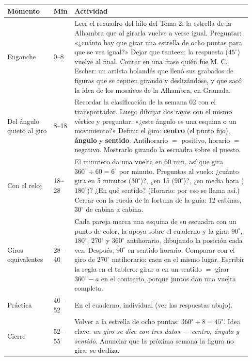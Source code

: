 \documentclass[11pt]{article}
\begin{document}
\begin{center}
{\renewcommand{\arraystretch}{1.3}
\begin{tabularx}{\linewidth}{@{}l l X@{}}
  \toprule
  \textbf{Momento} & \textbf{Min} & \textbf{Actividad}\\
  \midrule
  Enganche & 0--8 & Leer el recuadro del hilo del Tema 2: la estrella de la Alhambra que
    al girarla vuelve a verse igual. Preguntar: «¿cuánto hay que girar una estrella de
    ocho puntas para que se vea igual?» Dejar que tanteen; la respuesta ($45^\circ$)
    vuelve al final. Contar en una frase quién fue M. C. Escher: un artista holandés que
    llenó sus grabados de figuras que se repiten girando y deslizándose, y que sacó la
    idea de los mosaicos de la Alhambra, en Granada.\\
  Del ángulo quieto al giro & 8--18 & Recordar la clasificación de la semana 02 con el
    transportador. Luego dibujar dos rayos con el mismo vértice y preguntar: «¿este
    ángulo es una esquina o un movimiento?» Definir el giro: \textbf{centro} (el punto
    fijo), \textbf{ángulo} y \textbf{sentido}. Antihorario $=$ positivo, horario $=$
    negativo. Mostrarlo girando la escuadra sobre el puesto.\\
  Con el reloj & 18--28 & El minutero da una vuelta en 60 min, así que gira
    $360^\circ \div 60 = 6^\circ$ por minuto. Preguntas al vuelo: ¿cuánto gira en 5
    minutos ($30^\circ$)?, ¿en 15 ($90^\circ$)?, ¿en media hora ($180^\circ$)? ¿En qué
    sentido? (Horario: por eso se llama así.) Cerrar con la rueda de la fortuna de la
    guía: 12 cabinas, $30^\circ$ de cabina a cabina.\\
  Giros equivalentes & 28--40 & Cada pareja marca una esquina de su escuadra con un punto
    de color, la apoya sobre el cuaderno y la gira: $90^\circ$, $180^\circ$, $270^\circ$ y
    $360^\circ$ antihorario, dibujando la posición cada vez. Después, $90^\circ$ en
    sentido horario. Comparar con el giro de $270^\circ$ antihorario: caen en el mismo
    lugar. Escribir la regla en el tablero: girar $a$ en un sentido $=$ girar
    $360^\circ - a$ en el contrario, porque juntos dan una vuelta completa.\\
  Práctica & 40--52 & En el cuaderno, individual (ver las respuestas abajo).\\
  Cierre & 52--55 & Volver a la estrella de ocho puntas: $360^\circ \div 8 = 45^\circ$.
    Idea clave: \emph{un giro se dice con tres datos — centro, ángulo y sentido}. Anunciar
    que la próxima semana la figura no gira: se desliza.\\
  \bottomrule
\end{tabularx}}
\end{center}
\end{document}

